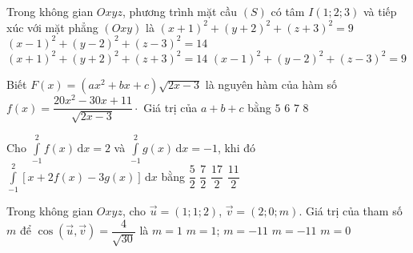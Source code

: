 \begin{ex}%
Trong không gian $O x y z$, phương trình mặt cầu $(S)$ có tâm $I(1 ; 2 ; 3)$ và tiếp xúc với mặt phẳng $(Oxy)$ là
\choice
{$(x+1)^{2}+(y+2)^{2}+(z+3)^{2}=9$}
{$(x-1)^{2}+(y-2)^{2}+(z-3)^{2}=14$}
{$(x+1)^{2}+(y+2)^{2}+(z+3)^{2}=14$}
{\True $(x-1)^{2}+(y-2)^{2}+(z-3)^{2}=9$}
\end{ex}

\begin{ex}%
Biết $F(x)=(a x^2+b x+c) \sqrt{2x-3}$ là nguyên hàm của hàm số $f(x)=\dfrac{20 x^2-30 x+11}{\sqrt{2x-3}} \cdot$ Giá trị của $a+b+c$ bằng
\choice
{$5$}
{$6$}
{\True $7$}
{$8$}
\end{ex}

\begin{ex}%
Cho $ \displaystyle \int\limits_{-1}^2 f(x) \mathrm{\,d}x=2 $ và $ \displaystyle \int\limits_{-1}^2 g(x) \mathrm{\,d}x=-1 $, khi đó $ \displaystyle \int\limits_{-1}^2 \left[x+2f(x)-3g(x)\right] \mathrm{\,d}x $ bằng
\choice
{$ \dfrac{5}{2} $}
{$ \dfrac{7}{2} $}
{\True $ \dfrac{17}{2} $}
{$ \dfrac{11}{2} $}
\end{ex}

\begin{ex}%
Trong không gian $Oxyz$, cho $\vec{u} =(1;1;2)$, $\vec{v} =(2;0;m)$. Giá trị của tham số $m$ để $\cos \left(\vec{u}, \vec{v} \right)= \dfrac{4}{\sqrt{30}}$ là \choice
{\True $m=1 $}
{$m=1 $; $m=-11$}
{$ m=-11 $}
{$m=0$}
\end{ex}

